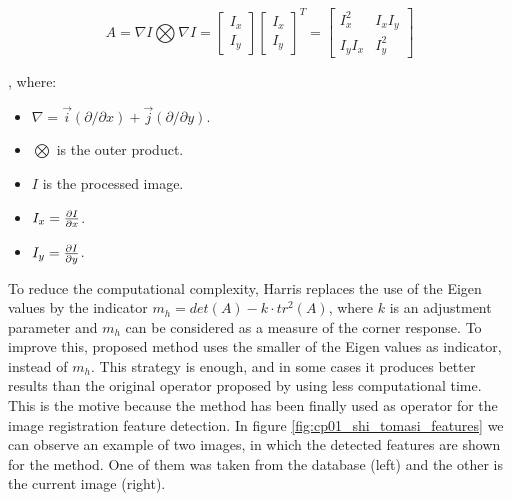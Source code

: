 \begin{equation}\label{eq:cp01_harris_matrix}
A = \nabla I \bigotimes \nabla I = 
\left [ \begin{array}{c} I_x \\ I_y \end{array} \right ]
\left [ \begin{array}{c} I_x \\ I_y \end{array} \right ]^T = 
\left [ \begin{array}{cc} 
I_x^2 & I_xI_y \\ 
I_yI_x & I_y^2
\end{array} \right ]
\end{equation}

, where:

\begin{itemize}
 \item $\nabla = \vec{i} (\partial / \partial x) + \vec{j} (\partial / \partial y)$.
 \item $\bigotimes$ is the outer product.
 \item $I$ is the processed image.
 \item $I_x = {{\partial I} \over {\partial x}}$.
 \item $I_y = {{\partial I} \over {\partial y}}$.
\end{itemize}

To reduce the computational complexity, Harris replaces the use of the Eigen values by the indicator $m_h = det(A) − k \cdot tr^2(A)$, where $k$ is an adjustment parameter and $m_h$ can be considered as a measure of the corner response. To improve this, \cite{shi1994good} proposed method uses the smaller of the Eigen values as indicator, instead of $m_h$. This strategy is enough, and in some cases it produces better results than the original operator proposed by \cite{harris1988combined} using less computational time. This is the motive because the \cite{shi1994good} method has been finally used as operator for the image registration feature detection. In figure \ref{fig:cp01_shi_tomasi_features} we can observe an example of two images, in which the detected features are shown for the \cite{shi1994good} method. One of them was taken from the database (left) and the other is the current image (right).

